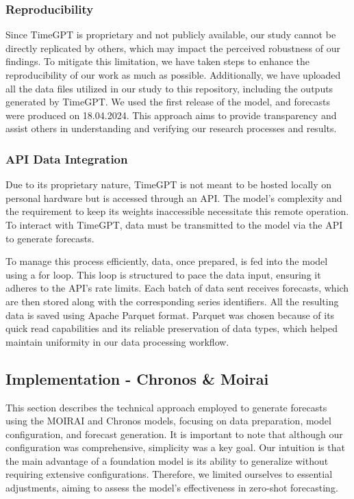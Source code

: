 \documentclass[12pt,a4paper]{article}
\begin{document}
\subsubsection{Reproducibility}

Since TimeGPT is proprietary and not publicly available, our study cannot be directly replicated by others, which may impact the perceived robustness of our findings. To mitigate this limitation, we have taken steps to enhance the reproducibility of our work as much as possible. Additionally, we have uploaded all the data files utilized in our study to this repository, including the outputs generated by TimeGPT. We used the first release of the model, and forecasts were produced on 18.04.2024. This approach aims to provide transparency and assist others in understanding and verifying our research processes and results.

\subsubsection{API Data Integration}

Due to its proprietary nature, TimeGPT is not meant to be hosted locally on personal hardware but is accessed through an API. The model's complexity and the requirement to keep its weights inaccessible necessitate this remote operation. To interact with TimeGPT, data must be transmitted to the model via the API to generate forecasts.

To manage this process efficiently, data, once prepared, is fed into the model using a for loop. This loop is structured to pace the data input, ensuring it adheres to the API's rate limits. Each batch of data sent receives forecasts, which are then stored along with the corresponding series identifiers. All the resulting data is saved using Apache Parquet format. Parquet was chosen because of its quick read capabilities and its reliable preservation of data types, which helped maintain uniformity in our data processing workflow.

\subsection{Implementation - Chronos \& Moirai}

This section describes the technical approach employed to generate forecasts using the MOIRAI and Chronos models, focusing on data preparation, model configuration, and forecast generation. It is important to note that although our configuration was comprehensive, simplicity was a key goal. Our intuition is that the main advantage of a foundation model is its ability to generalize without requiring extensive configurations. Therefore, we limited ourselves to essential adjustments, aiming to assess the model’s effectiveness in zero-shot forecasting. 
\end{document}
